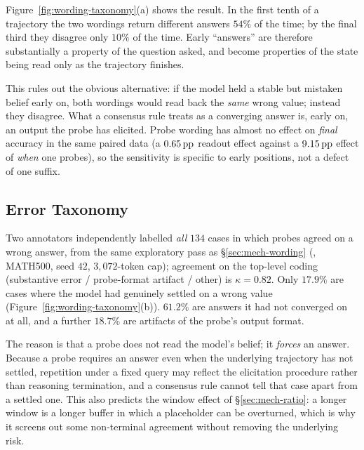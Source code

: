 Figure~\ref{fig:wording-taxonomy}(a) shows the result. In the first tenth of a
trajectory the two wordings return different answers $54\%$ of the time; by the
final third they disagree only $10\%$ of the time. Early ``answers'' are
therefore substantially a property of the question asked, and become properties
of the state being read only as the trajectory finishes.

This rules out the obvious alternative: if the model held a stable but mistaken
belief early on, both wordings would read back the \emph{same} wrong value;
instead they disagree. What a consensus rule treats as a converging answer is,
early on, an output the probe has elicited. Probe wording has almost no effect
on \emph{final} accuracy in the same paired data (a $0.65\,\text{pp}$ readout effect
against a $9.15\,\text{pp}$ effect of \emph{when} one probes), so the sensitivity is
specific to early positions, not a defect of one suffix.

\subsection{Error Taxonomy}
\label{sec:mech-placeholder}
Two annotators independently labelled \emph{all} $134$ cases in which probes
agreed on a wrong answer, from the same exploratory pass as
\S\ref{sec:mech-wording} (\dsseven{}, \textsc{MATH}500, seed $42$,
$3{,}072$-token cap); agreement on the top-level coding (substantive error /
probe-format artifact / other) is $\kappa=0.82$. Only $17.9\%$ are cases where
the model had genuinely settled on a wrong value
(Figure~\ref{fig:wording-taxonomy}(b)). $61.2\%$ are answers it had not
converged on at all, and a further $18.7\%$ are artifacts of the probe's output
format.

The reason is that a probe does not read the model's belief; it \emph{forces} an
answer. Because a probe requires an answer even when the underlying trajectory
has not settled, repetition under a fixed query may reflect the elicitation
procedure rather than reasoning termination, and a consensus rule cannot tell
that case apart from a settled one. This also predicts the window effect of \S\ref{sec:mech-ratio}: a
longer window is a longer buffer in which a placeholder can be overturned, which
is why it screens out some non-terminal agreement without removing the
underlying risk.


